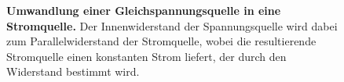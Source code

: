 {\begin{figure}[H]
\begin{minipage}{0.45\textwidth}
\begin{circuitikz}[scale=0.9]
        \end{circuitikz}
        
    \end{minipage}
    \caption{\textbf{Umwandlung einer Gleichspannungsquelle in eine Stromquelle.} Der Innenwiderstand der Spannungsquelle wird dabei zum Parallelwiderstand der
     Stromquelle, wobei die resultierende Stromquelle einen konstanten Strom liefert, der durch den Widerstand bestimmt wird.}
    \label{fig:Umrechnung}

\end{figure}
}






